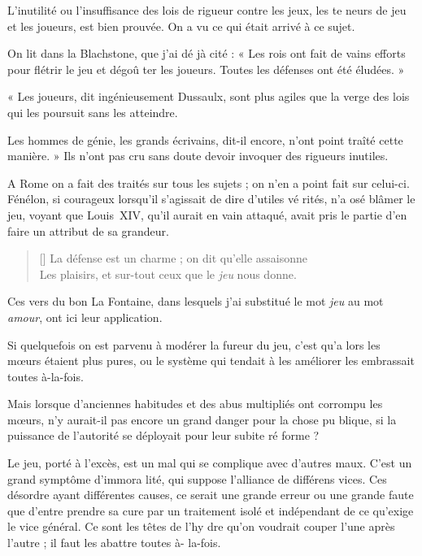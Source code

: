 L'inutilité ou l'insuffisance des lois
de rigueur contre les jeux, les te%
neurs de jeu et les joueurs, est bien
prouvée. On a vu ce qui était arrivé à
ce sujet.

On lit dans la Blachstone, que j'ai dé%
jà cité : « Les rois ont fait de vains
efforts pour flétrir le jeu et dégoû%
ter les joueurs. Toutes les défenses
ont été éludées. »

« Les joueurs, dit ingénieusement
Dussaulx, sont plus agiles que la 
verge des lois qui les poursuit sans
les atteindre.

Les hommes de génie, les grands
écrivains, dit-il encore, n'ont point
traîté cette manière. » Ils n'ont pas
cru sans doute devoir invoquer des
rigueurs inutiles.

A Rome on a fait des traités sur
tous les sujets ; on n'en a point fait
sur celui-ci. Fénélon, si courageux
lorsqu'il s'agissait de dire d'utiles vé%
rités, n'a osé blâmer le jeu, voyant
que Louis~XIV, qu'il aurait en vain
attaqué, avait pris le partie d'en faire
un attribut de sa grandeur.

{
  \fontsize{7.2pt}{10.3pt}\selectfont
  \begin{verse}[\versewidth]
    La défense est un charme ; on dit qu'elle assaisonne \\
    Les plaisirs, et sur-tout ceux que le \emph{jeu} nous donne.
  \end{verse}
}

Ces vers du bon La Fontaine, dans
lesquels j'ai substitué le mot \emph{jeu} au
mot \emph{amour}, ont ici leur application.

Si quelquefois on est parvenu à
modérer la fureur du jeu, c'est qu'a%
lors les m{\oe}urs étaient plus pures, ou
le système qui tendait à les améliorer
les embrassait toutes à-la-fois.

Mais lorsque d'anciennes habitudes
et des abus multipliés ont corrompu
les m{\oe}urs, n'y aurait-il pas encore
un grand danger pour la chose pu%
blique, si la puissance de l'autorité
se déployait pour leur subite ré%
forme ?

Le jeu, porté à l'excès, est un mal
qui se complique avec d'autres maux.
C'est un grand symptôme d'immora%
lité, qui suppose l'alliance de différens
vices. Ces désordre ayant différentes
causes, ce serait une grande erreur
ou une grande faute que d'entre%
prendre sa cure par un traitement
isolé et indépendant de ce qu'exige le
vice général. Ce sont les têtes de l'hy%
dre qu'on voudrait couper l'une après
l'autre ; il faut les abattre toutes à-%
la-fois.

